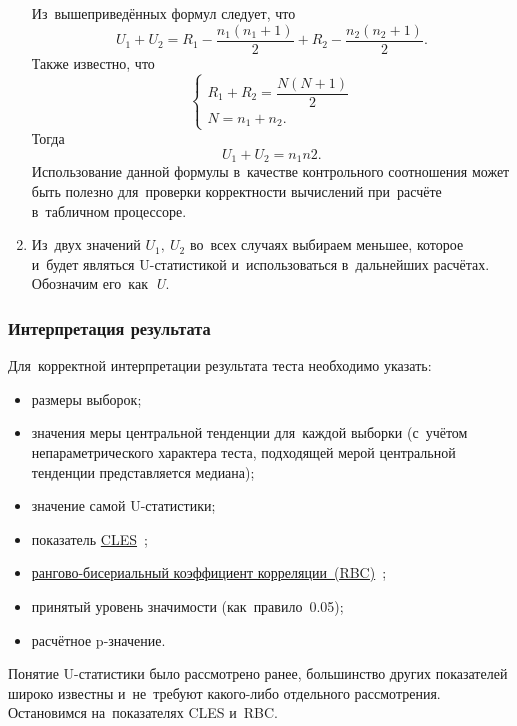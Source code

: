 \documentclass[]{scrartcl}
\begin{document}
\begin{enumerate}
	Из~вышеприведённых формул следует, что
	\begin{equation}\label{eq:U1-U2-relation}
	U_{1}+U_{2} = R_{1}-\frac{n_{1}(n_{1}+1)}{2} + R_{2}-\frac{n_{2}(n_{2}+1)}{2}.
	\end{equation}
	Также известно, что
	\begin{equation}\label{eq:R-N-relation}
	\begin{cases}
	R_{1}+R_{2}=\dfrac{N(N+1)}{2}\\
	N=n_{1}+n_{2}.
	\end{cases}
	\end{equation}
	Тогда
	\begin{equation}\label{eq:check-U-value}
	U_{1}+U_{2}=n_{1}n{2}.
	\end{equation}
	Использование данной формулы в~качестве контрольного соотношения может быть полезно для~проверки корректности вычислений при~расчёте в~табличном процессоре.
	\item Из~двух значений ${\textstyle U_{1},\ U_{2}}$ во~всех случаях выбираем меньшее, которое и~будет являться U-статистикой и~использоваться в~дальнейших расчётах. Обозначим его~как~\textit{U}.
\end{enumerate}
\subsubsection{Интерпретация результата}
Для~корректной интерпретации результата теста необходимо указать:
\begin{itemize}
	\item размеры выборок;
	\item значения меры центральной тенденции для~каждой выборки (с~учётом непараметрического характера теста, подходящей мерой центральной тенденции представляется медиана);
	\item значение самой U-статистики;
	\item показатель \href{https://en.wikipedia.org/wiki/Effect_size#Common_language_effect_size}{CLES}~\cite{Wiki:CLES};
	\item \href{https://en.wikipedia.org/wiki/Effect_size#Rank-biserial_correlation}{рангово-бисериальный коэффициент корреляции~(RBC)}~\cite{Wiki:rank-biserial-correlation};
	\item принятый уровень значимости (как~правило~0.05);
	\item расчётное p-значение.
\end{itemize}
Понятие U-статистики было рассмотрено ранее, большинство других показателей широко известны и~не~требуют какого-либо отдельного рассмотрения. Остановимся на~показателях CLES и~RBC.
\end{document}
